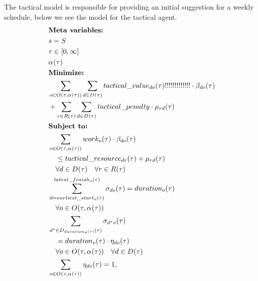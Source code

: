 The tactical model is responsible for providing an initial suggestion for a weekly schedule, below we see the model for the tactical agent.
\begin{alignat}{2}
	& \textbf{Meta variables:} \notag\\
	& \ElementScheduler = \SetScheduler \notag\\
	& \tau \in [0, \infty] \notag\\
	& \VarStrategicWorkOrderAssignment{}{} \notag\\
	& \textbf{Minimize:} \notag\\
	& \sum_{\ElementOperation \in \SetOperation{}{\VarStrategicWorkOrderAssignment{}{}}} \sum_{\ElementDays \in \SetDays{}} \ParTacticalValue!!!!!!!!!!!!! \cdot \VarTacticalWork{\ElementDays}{\ElementOperation}\notag\\  
	& + \sum_{r \in \SetResource} \sum_{\ElementDays \in \SetDays{}} \ParTacticalPenalty \cdot \VarTacticalExcess                                               \\  
	& \textbf{Subject to:}                                                          \notag                                                                   \\
	& \sum_{\ElementOperation \in \SetOperation{}{\VarStrategicWorkOrderAssignment{}{}}} \ParOperationWork{\ElementOperation} \cdot \VarTacticalWork{\ElementDays}{\ElementOperation}\notag\\
	& \quad \leq \ParTacticalResource + \VarTacticalExcess\notag\\ 
	& \quad \forall \ElementDays \in \SetDays{} \quad \forall r \in \SetResource\\ 
	& \sum_{\ElementDays = \ParEarliestStart}^{\ParLatestFinish} \VarTacticalWorkBinary{\ElementDays}{\ElementOperation} = \ParDuration \notag\\
	& \quad \forall \ElementOperation \in \SetOperation{}{\VarStrategicWorkOrderAssignment{}{}} \\
	& \sum_{\ElementDays^* \in  \SetDays{\ParDuration}} \VarTacticalWorkBinary{\ElementDays^*}{\ElementOperation} \notag\\
	& \quad = \ParDuration \cdot \VarTacticalWorkBinaryConsecutive \notag\\ 
	& \quad \forall \ElementOperation \in \SetOperation{}{\VarStrategicWorkOrderAssignment{}{}} \quad \forall \ElementDays \in \SetDays{} \\
	& \sum_{\ElementOperation \in \SetOperation{}{\VarStrategicWorkOrderAssignment{}{}}} \VarTacticalWorkBinaryConsecutive = 1, \notag\\

\end{alignat}
